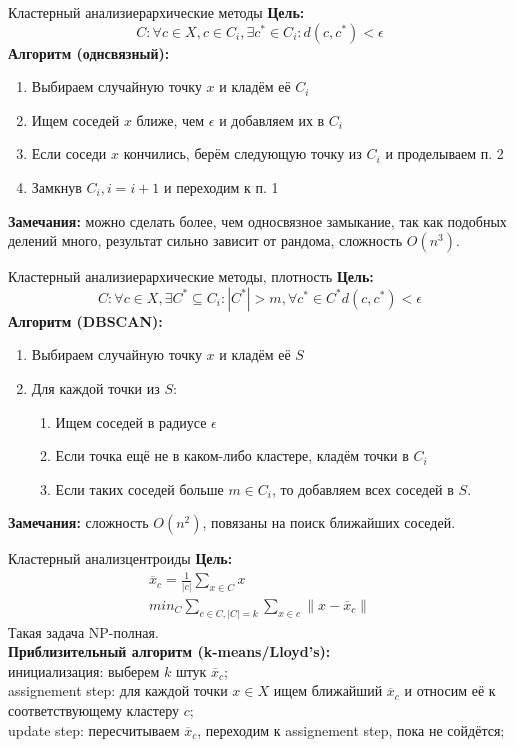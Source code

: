 \documentclass[14pt, fleqn, xcolor={dvipsnames, table}]{beamer}
\begin{document}
\begin{frame}{Кластерный анализ}{иерархические методы}
\small
\textbf{Цель:}
$$
  C: \forall c \in X, c \in C_i, \exists c^* \in C_i : d(c, c^*) < \epsilon
$$
\textbf{Алгоритм (однсвязный):}
\begin{enumerate}
  \item Выбираем случайную точку $x$ и кладём её $C_i$
  \item Ищем соседей $x$ ближе, чем $\epsilon$ и добавляем их в $C_i$
  \item Если соседи $x$ кончились, берём следующую точку из $C_i$ и проделываем п. 2
  \item Замкнув $C_i, i = i+1$ и переходим к п. 1
\end{enumerate}
\textbf{Замечания:} можно сделать более, чем односвязное замыкание, так как подобных делений много, результат сильно зависит от рандома, сложность $O(n^3)$.
\end{frame}

\begin{frame}{Кластерный анализ}{иерархические методы, плотность}
\small
\textbf{Цель:}
$$
  C: \forall c \in X, \exists C^* \subseteq C_i: |C^*| > m, \forall c^* \in C^* d(c, c^*) < \epsilon
$$
\textbf{Алгоритм (DBSCAN):}
\begin{enumerate}
  \item Выбираем случайную точку $x$ и кладём её $S$
  \item Для каждой точки из $S$:
  \begin{enumerate}
    \item Ищем соседей в радиусе $\epsilon$
    \item Если точка ещё не в каком-либо кластере, кладём точки в $C_i$
    \item Если таких соседей больше $m \in C_i$, то добавляем всех соседей в $S$. 
  \end{enumerate}
  
\end{enumerate}
\textbf{Замечания:} сложность $O(n^2)$, повязаны на поиск ближайших соседей.
\end{frame}

\begin{frame}{Кластерный анализ}{центроиды}
\small
\textbf{Цель:}
$$\begin{array}{l}
  \overline{x}_c = \frac{1}{|c|}\sum_{x \in C} x \\
  min_C \sum_{c \in C, |C| = k} \sum_{x \in c} \|x - \overline{x}_c\|
\end{array}$$
Такая задача NP-полная. \\
\textbf{Приблизительный алгоритм (k-means/Lloyd's):} \\
{\color{blue}инициализация:} выберем $k$ штук $\overline{x}_c$; \\
{\color{blue}assignement step:} для каждой точки $x \in X$ ищем ближайший $\overline{x}_c$ и относим её к соответствующему кластеру $c$; \\
{\color{blue}update step:} пересчитываем $\overline{x}_c$, переходим к assignement step, пока не сойдётся; \\
\end{frame}
\end{document}
